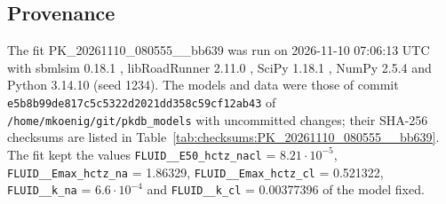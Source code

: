 \subsection{Provenance}

The fit PK\_20261110\_080555\_\_bb639 was run on 2026-11-10 07:06:13 UTC with sbmlsim 0.18.1 \cite{Koenig2026_sbmlsim}, libRoadRunner 2.11.0 \cite{Welsh2023}, SciPy 1.18.1 \cite{Virtanen2020}, NumPy 2.5.4 \cite{Harris2020} and Python 3.14.10 (seed 1234). The models and data were those of commit \texttt{e5b8b99de817c5c5322d2021dd358c59cf12ab43} of \texttt{/home/mkoenig/git/pkdb\_models} with uncommitted changes; their SHA-256 checksums are listed in Table~\ref{tab:checksums:PK_20261110_080555__bb639}. The fit kept the values \texttt{FLUID\_\_E50\_hctz\_nacl} = $8.21 \cdot 10^{-5}$, \texttt{FLUID\_\_Emax\_hctz\_na} = 1.86329, \texttt{FLUID\_\_Emax\_hctz\_cl} = 0.521322, \texttt{FLUID\_\_k\_na} = $6.6 \cdot 10^{-4}$ and \texttt{FLUID\_\_k\_cl} = 0.00377396 of the model fixed.

